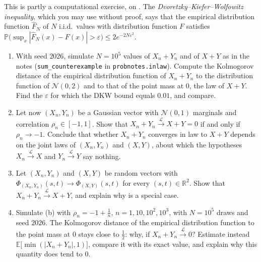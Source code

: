 \begin{exercise}\label{ex:cl-sums}
\medium This is partly a computational exercise, on . The
\emph{Dvoretzky--Kiefer--Wolfowitz inequality}, which you may use without proof, says that the
empirical distribution function $\hat F_N$ of $N$ i.i.d.\ values with distribution function $F$
satisfies $\mathbb P\big(\sup_x|\hat F_N(x)-F(x)|>\varepsilon\big)\le2e^{-2N\varepsilon^2}$.
\begin{enumerate}[label=(\alph*)]
  \item With seed $2026$, simulate $N=10^5$ values of $X_n+Y_n$ and of $X+Y$ as in the notes
    (\texttt{sum\_counterexample} in \texttt{probnotes.inlaw}). Compute the Kolmogorov distance of
    the empirical distribution function of $X_n+Y_n$ to the distribution function of
    $\mathcal N(0,2)$ and to that of the point mass at $0$, the law of $X+Y$. Find the
    $\varepsilon$ for which the DKW bound equals $0.01$, and compare.
  \item Let now $(X_n,Y_n)$ be a Gaussian vector with $\mathcal N(0,1)$ marginals and
    correlation $\rho_n\in[-1,1]$. Show that $X_n+Y_n\xrightarrow{\mathcal L}X+Y=0$ if and only
    if $\rho_n\to-1$. Conclude that whether $X_n+Y_n$ converges in law to $X+Y$ depends on the
    joint laws of $(X_n,Y_n)$ and $(X,Y)$, about which the hypotheses $X_n\xrightarrow{\mathcal
    L}X$ and $Y_n\xrightarrow{\mathcal L}Y$ say nothing.
  \item Let $(X_n,Y_n)$ and $(X,Y)$ be random vectors with
    $\Phi_{(X_n,Y_n)}(s,t)\to\Phi_{(X,Y)}(s,t)$ for every $(s,t)\in\mathbb R^2$. Show that
    $X_n+Y_n\xrightarrow{\mathcal L}X+Y$, and explain why  is a special case.
  \item Simulate (b) with $\rho_n=-1+\frac1n$, $n=1,10,10^2,10^3$, with $N=10^5$ draws and seed
    $2026$. The Kolmogorov distance of the empirical distribution function to the point mass
    at $0$ stays close to $\frac12$: why, if $X_n+Y_n\xrightarrow{\mathcal L}0$? Estimate instead
    $\mathbb E\big[\min(|X_n+Y_n|,1)\big]$, compare it with its exact value, and explain why this
    quantity does tend to $0$.
\end{enumerate}
\end{exercise}

